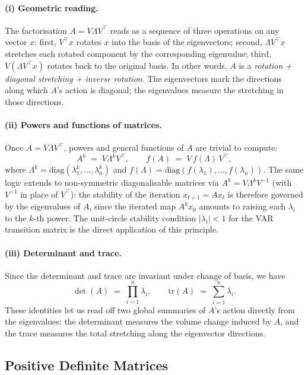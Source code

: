 \documentclass[11pt, a4paper, oneside]{article}
\begin{document}
\paragraph{(i) Geometric reading.}
The factorisation $A = V \Lambda V^{\top}$ reads as a sequence of
three operations on any vector $x$: first, $V^{\top} x$ rotates $x$
into the basis of the eigenvectors; second, $\Lambda V^{\top} x$
stretches each rotated component by the corresponding eigenvalue;
third, $V (\Lambda V^{\top} x)$ rotates back to the original basis.
In other words, $A$ is a \emph{rotation + diagonal stretching +
inverse rotation}. The eigenvectors mark the directions along which
$A$'s action is diagonal; the eigenvalues measure the stretching in
those directions.

\paragraph{(ii) Powers and functions of matrices.}
Once $A = V \Lambda V^{\top}$, powers and general functions of $A$
are trivial to compute:
\[
A^k \;=\; V \Lambda^k V^{\top}, \qquad
f(A) \;=\; V\, f(\Lambda)\, V^{\top},
\]
where $\Lambda^k = \mathrm{diag}(\lambda_1^k, \ldots, \lambda_n^k)$
and $f(\Lambda) = \mathrm{diag}(f(\lambda_1), \ldots, f(\lambda_n))$.
The same logic extends to non-symmetric diagonalisable matrices via
$A^k = V \Lambda^k V^{-1}$ (with $V^{-1}$ in place of $V^{\top}$):
the stability of the iteration $x_{t+1} = A x_t$ is therefore
governed by the eigenvalues of $A$, since the iterated map
$A^k x_0$ amounts to raising each $\lambda_i$ to the $k$-th power.
The unit-circle stability condition $|\lambda_i| < 1$ for the VAR
transition matrix is the direct application of this principle.

\paragraph{(iii) Determinant and trace.}
Since the determinant and trace are invariant under change of basis,
we have
\[
\det(A) \;=\; \prod_{i=1}^{n} \lambda_i, \qquad
\mathrm{tr}(A) \;=\; \sum_{i=1}^{n} \lambda_i.
\]
These identities let us read off two global summaries of $A$'s action
directly from the eigenvalues: the determinant measures the volume
change induced by $A$, and the trace measures the total stretching
along the eigenvector directions.

\subsection{Positive Definite Matrices}
\end{document}
